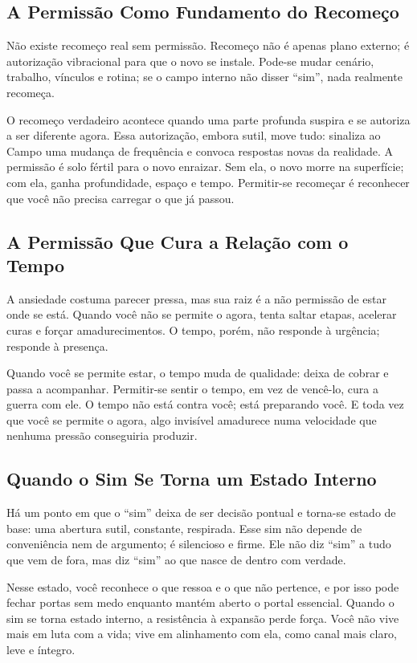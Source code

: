 \documentclass[12pt]{book}
\begin{document}
\subsection*{A Permissão Como Fundamento do Recomeço}

Não existe recomeço real sem permissão. Recomeço não é apenas plano externo; é autorização vibracional para que o novo se instale. Pode-se mudar cenário, trabalho, vínculos e rotina; se o campo interno não disser \enquote{sim}, nada realmente recomeça.

O recomeço verdadeiro acontece quando uma parte profunda suspira e se autoriza a ser diferente agora. Essa autorização, embora sutil, move tudo: sinaliza ao Campo uma mudança de frequência e convoca respostas novas da realidade. A permissão é solo fértil para o novo enraizar. Sem ela, o novo morre na superfície; com ela, ganha profundidade, espaço e tempo. Permitir-se recomeçar é reconhecer que você não precisa carregar o que já passou.

\subsection*{A Permissão Que Cura a Relação com o Tempo}

A ansiedade costuma parecer pressa, mas sua raiz é a não permissão de estar onde se está. Quando você não se permite o agora, tenta saltar etapas, acelerar curas e forçar amadurecimentos. O tempo, porém, não responde à urgência; responde à presença.

Quando você se permite estar, o tempo muda de qualidade: deixa de cobrar e passa a acompanhar. Permitir-se sentir o tempo, em vez de vencê-lo, cura a guerra com ele. O tempo não está contra você; está preparando você. E toda vez que você se permite o agora, algo invisível amadurece numa velocidade que nenhuma pressão conseguiria produzir.

\subsection*{Quando o Sim Se Torna um Estado Interno}

Há um ponto em que o \enquote{sim} deixa de ser decisão pontual e torna-se estado de base: uma abertura sutil, constante, respirada. Esse sim não depende de conveniência nem de argumento; é silencioso e firme. Ele não diz \enquote{sim} a tudo que vem de fora, mas diz \enquote{sim} ao que nasce de dentro com verdade.

Nesse estado, você reconhece o que ressoa e o que não pertence, e por isso pode fechar portas sem medo enquanto mantém aberto o portal essencial. Quando o sim se torna estado interno, a resistência à expansão perde força. Você não vive mais em luta com a vida; vive em alinhamento com ela, como canal mais claro, leve e íntegro.
\end{document}
